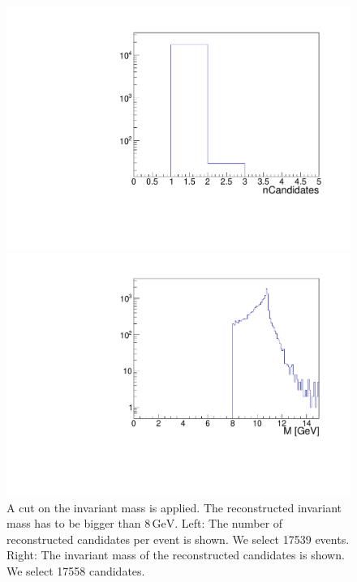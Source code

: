 \documentclass[a4paper,11pt,twosided,final,german,openbib,pdftex,listof=totoc,bibliography=totoc]{scrbook}
\begin{document}
\begin{figure}[h!]
	\centering
	\begin{minipage}[b]{0.45\linewidth}
		\centering
		\includegraphics[width=\textwidth]{Cuts/nCandM.pdf}
	\end{minipage}
	\hspace{0.5cm}
	\begin{minipage}[b]{0.45\linewidth}
		\centering
		\includegraphics[width=\textwidth]{Cuts/MM.pdf}
	\end{minipage}
	\caption[Number Of Candidates And Invariant Mass ($\textrm{M} >8\,\textrm{GeV}$)]{A cut on the invariant mass is applied. The reconstructed invariant mass has to be bigger than $8\,\textrm{GeV}$. Left: The number of reconstructed candidates per event is shown. We select 17539 events. Right: The invariant mass of the reconstructed candidates is shown. We select 17558 candidates.}
	\label{fig:nCandM}
\end{figure}
\end{document}
